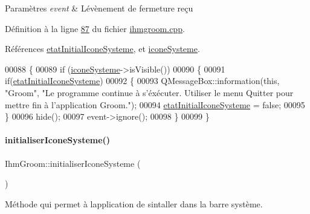 \begin{DoxyParams}{Paramètres}
{\em event} & L\textquotesingle{}évènement de fermeture reçu \\
\hline
\end{DoxyParams}


Définition à la ligne \hyperlink{ihmgroom_8cpp_source_l00087}{87} du fichier \hyperlink{ihmgroom_8cpp_source}{ihmgroom.\+cpp}.



Références \hyperlink{ihmgroom_8h_source_l00099}{etat\+Initial\+Icone\+Systeme}, et \hyperlink{ihmgroom_8h_source_l00093}{icone\+Systeme}.


\begin{DoxyCode}
00088 \{
00089     \textcolor{keywordflow}{if} (\hyperlink{class_ihm_groom_a9ca0929cf284a9a2e3e2bc3489249919}{iconeSysteme}->isVisible())
00090     \{
00091         \textcolor{keywordflow}{if}(\hyperlink{class_ihm_groom_a95d2d2b4b3b849c1b21f234844fca056}{etatInitialIconeSysteme})
00092         \{
00093             QMessageBox::information(\textcolor{keyword}{this}, \textcolor{stringliteral}{"Groom"}, \textcolor{stringliteral}{"Le programme continue à s'éxécuter. Utiliser le menu
       Quitter pour mettre fin à l'application Groom."});
00094             \hyperlink{class_ihm_groom_a95d2d2b4b3b849c1b21f234844fca056}{etatInitialIconeSysteme} = \textcolor{keyword}{false};
00095         \}
00096         hide();
00097         \textcolor{keyword}{event}->ignore();
00098     \}
00099 \}
\end{DoxyCode}
\mbox{\label{class_ihm_groom_addfe25c3da6ddecfbdcb5b3cf062d724}} 
\paragraph{\texorpdfstring{initialiser\+Icone\+Systeme()}{initialiserIconeSysteme()}}
{\footnotesize\ttfamily Ihm\+Groom\+::initialiser\+Icone\+Systeme (\begin{DoxyParamCaption}{ }\end{DoxyParamCaption})\hspace{0.3cm}{\ttfamily [private]}}



Méthode qui permet à l\textquotesingle{}application de s\textquotesingle{}intaller dans la barre système. 

